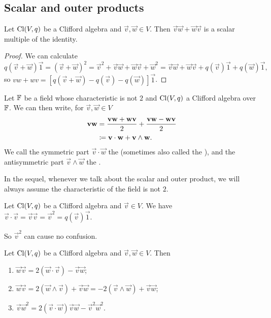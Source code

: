 \subsection{Scalar and outer products}
\begin{lemma}
Let $\operatorname{Cl}(V,q)$ be a Clifford algebra and $\vec{v},\vec{w}\in V$. Then $\vec{v}\vec{w} + \vec{w}\vec{v}$ is a scalar multiple of the identity.
\end{lemma}
\begin{proof}
We can calculate
\[ q(\vec{v}+\vec{w})\vec{1} = (\vec{v}+\vec{w})^2 = \vec{v}^2 + \vec{v}\vec{w} + \vec{w}\vec{v} + \vec{w}^2 = \vec{v}\vec{w} + \vec{w}\vec{v} + q(\vec{v})\vec{1} + q(\vec{w})\vec{1}, \]
so $vw+wv = [q(\vec{v}+\vec{w})-q(\vec{v})-q(\vec{w})]\vec{1}$.
\end{proof}

\begin{definition}
Let $\mathbb{F}$ be a field whose characteristic is not $2$ and $\operatorname{Cl}(V,q)$ a Clifford algebra over $\mathbb{F}$. We can then write, for $\vec{v},\vec{w}\in V$
\begin{align*}
\boldsymbol{\mathrm{v}}\boldsymbol{\mathrm{w}} &= \frac{\boldsymbol{\mathrm{v}}\boldsymbol{\mathrm{w}}+\boldsymbol{\mathrm{w}}\boldsymbol{\mathrm{v}}}{2} + \frac{\boldsymbol{\mathrm{v}}\boldsymbol{\mathrm{w}}-\boldsymbol{\mathrm{w}}\boldsymbol{\mathrm{v}}}{2} \\
&\coloneqq \boldsymbol{\mathrm{v}}\cdot \boldsymbol{\mathrm{w}} + \boldsymbol{\mathrm{v}}\wedge \boldsymbol{\mathrm{w}}.
\end{align*}
We call the symmetric part $\vec{v}\cdot \vec{w}$ the  (sometimes also called the ),
and the antisymmetric part $\vec{v}\wedge \vec{w}$ the .
\end{definition}
In the sequel, whenever we talk about the scalar and outer product, we will always assume the characteristic of the field is not $2$.

\begin{lemma}
Let $\operatorname{Cl}(V,q)$ be a Clifford algebra and $\vec{v}\in V$. We have $\vec{v}\cdot \vec{v} = \vec{v}\vec{v} = \vec{v}^2 = q(\vec{v})\vec{1}$.
\end{lemma}
So $\vec{v}^2$ can cause no confusion.

\begin{lemma} \label{CliffordAlgebraVectorSwap}
Let $\operatorname{Cl}(V,q)$ be a Clifford algebra and $\vec{v},\vec{w}\in V$.
Then
\begin{enumerate}
\item $\vec{w}\vec{v} = 2(\vec{w}\cdot \vec{v}) - \vec{v}\vec{w}$;
\item $\vec{w}\vec{v} = 2(\vec{w}\wedge \vec{v}) + \vec{v}\vec{w} = -2(\vec{v}\wedge \vec{w}) + \vec{v}\vec{w}$;
\item $\vec{v}\vec{w}^2 = 2 (\vec{v}\cdot \vec{w})\vec{v}\vec{w} - \vec{v}^2 \vec{w}^2$.
\end{enumerate}
\end{lemma}

